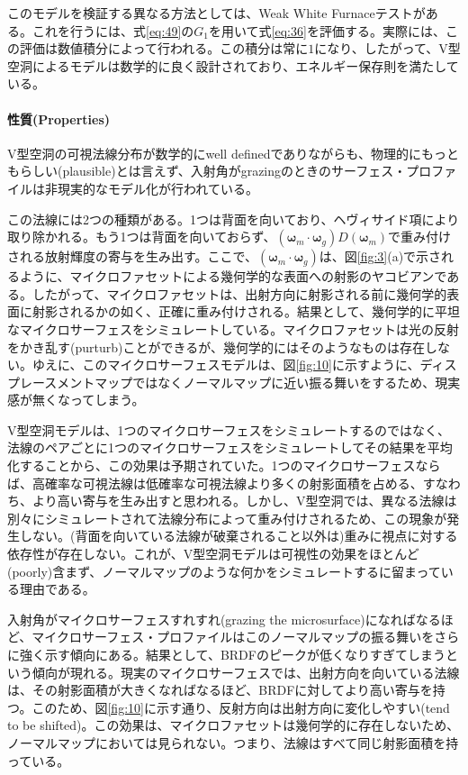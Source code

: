 \documentclass[a4j,xelatex,ja=standard]{bxjsarticle}
\begin{document}
このモデルを検証する異なる方法としては、Weak White Furnaceテストがある。これを行うには、式\eqref{eq:49}の$G_1$を用いて式\eqref{eq:36}を評価する。実際には、この評価は数値積分によって行われる。この積分は常に$1$になり、したがって、V型空洞によるモデルは数学的に良く設計されており、エネルギー保存則を満たしている。

\paragraph{性質(Properties)}

V型空洞の可視法線分布が数学的にwell definedでありながらも、物理的にもっともらしい(plausible)とは言えず、入射角がgrazingのときのサーフェス・プロファイルは非現実的なモデル化が行われている。

この法線には2つの種類がある。1つは背面を向いており、ヘヴィサイド項により取り除かれる。もう1つは背面を向いておらず、$(\boldsymbol{\omega}_m \cdot \boldsymbol{\omega}_g) D(\boldsymbol{\omega}_m)$で重み付けされる放射輝度の寄与を生み出す。ここで、$(\boldsymbol{\omega}_m \cdot \boldsymbol{\omega}_g)$は、図\ref{fig:3}(a)で示されるように、マイクロファセットによる幾何学的な表面への射影のヤコビアンである。したがって、マイクロファセットは、出射方向に射影される前に幾何学的表面に射影されるかの如く、正確に重み付けされる。結果として、幾何学的に平坦なマイクロサーフェスをシミュレートしている。マイクロファセットは光の反射をかき乱す(purturb)ことができるが、幾何学的にはそのようなものは存在しない。ゆえに、このマイクロサーフェスモデルは、図\ref{fig:10}に示すように、ディスプレースメントマップではなくノーマルマップに近い振る舞いをするため、現実感が無くなってしまう。

V型空洞モデルは、1つのマイクロサーフェスをシミュレートするのではなく、法線のペアごとに1つのマイクロサーフェスをシミュレートしてその結果を平均化することから、この効果は予期されていた。1つのマイクロサーフェスならば、高確率な可視法線は低確率な可視法線より多くの射影面積を占める、すなわち、より高い寄与を生み出すと思われる。しかし、V型空洞では、異なる法線は別々にシミュレートされて法線分布によって重み付けされるため、この現象が発生しない。(背面を向いている法線が破棄されること以外は)重みに視点に対する依存性が存在しない。これが、V型空洞モデルは可視性の効果をほとんど(poorly)含まず、ノーマルマップのような何かをシミュレートするに留まっている理由である。

入射角がマイクロサーフェスすれすれ(grazing the microsurface)になればなるほど、マイクロサーフェス・プロファイルはこのノーマルマップの振る舞いをさらに強く示す傾向にある。結果として、BRDFのピークが低くなりすぎてしまうという傾向が現れる。現実のマイクロサーフェスでは、出射方向を向いている法線は、その射影面積が大きくなればなるほど、BRDFに対してより高い寄与を持つ。このため、図\ref{fig:10}に示す通り、反射方向は出射方向に変化しやすい(tend to be shifted)。この効果は、マイクロファセットは幾何学的に存在しないため、ノーマルマップにおいては見られない。つまり、法線はすべて同じ射影面積を持っている。
\end{document}
